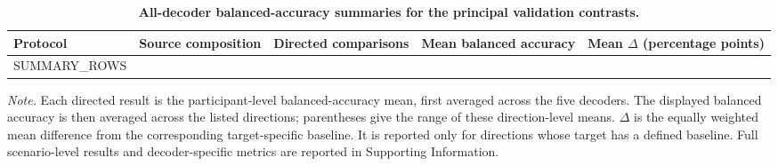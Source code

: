 \begingroup
\singlespacing
\normalsize
\setlength{\tabcolsep}{4pt}
\renewcommand{\arraystretch}{1.15}
\begin{table}[H]
\centering
\caption{\textbf{All-decoder balanced-accuracy summaries for the principal validation contrasts.}}
\label{tab:results_summary}
\begin{tabular}{@{}>{\raggedright\arraybackslash}p{2.0cm}>{\raggedright\arraybackslash}p{2.6cm}>{\centering\arraybackslash}p{1.25cm}>{\centering\arraybackslash}p{2.35cm}>{\centering\arraybackslash}p{1.8cm}@{}}
\hline
Protocol & Source composition & Directed comparisons & Mean balanced accuracy & Mean $\Delta$ (percentage points) \\
\hline
SUMMARY_ROWS
\hline
\end{tabular}
\begin{flushleft}
\textit{Note.} Each directed result is the participant-level balanced-accuracy mean, first averaged across the five decoders. The displayed balanced accuracy is then averaged across the listed directions; parentheses give the range of these direction-level means. $\Delta$ is the equally weighted mean difference from the corresponding target-specific baseline. It is reported only for directions whose target has a defined baseline. Full scenario-level results and decoder-specific metrics are reported in Supporting Information.
\end{flushleft}
\end{table}
\endgroup
